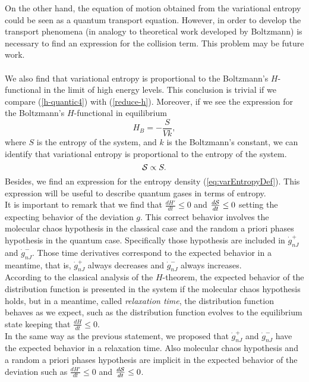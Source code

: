 On the other hand, the equation of motion obtained from the variational entropy could be seen as a quantum transport equation. However, in order to develop the transport phenomena (in analogy to theoretical work developed by Boltzmann) is necessary to find an expression for the collision term. This problem may be future work.\\
\\
We also find that variational entropy is proportional to the Boltzmann's $H$-functional in the limit of high energy levels. This conclusion is trivial if we compare (\ref{h-quantic4}) with (\ref{reduce-h}). Moreover, if we see the expression for the Boltzmann's $H$-functional in equilibrium
\begin{equation}
    H_{B}=-\frac{S}{Vk},
\end{equation}
where $S$ is the entropy of the system, and $k$ is the Boltzmann's constant, we can identify that variational entropy is proportional to the entropy of the system.\\
\begin{equation}
    \mathcal{S}\propto S.
\end{equation}
Besides, we find an expression for the entropy density (\ref{eq:varEntropyDef}). This expression will be useful to describe quantum gases in terms of entropy.\\
It is important to remark that we find that $\frac{dH'}{dt}\leq 0$ and $\frac{d\mathcal{S}}{dt}\leq 0$ setting the expecting behavior of the deviation $g$. This correct behavior involves the molecular chaos hypothesis in the classical case and the random a priori phases hypothesis in the quantum case. Specifically those hypothesis are included in $\dot{g}_{nJ}^{+}$ and $\dot{g}_{nJ}^{-}$. Those time derivatives correspond to the expected behavior in a meantime, that is, $\dot{g}_{nJ}^{+}$ always decreases and $\dot{g}_{nJ}^{-}$ always increases.\\ 
According to the classical analysis of the $H$-theorem, the expected behavior of the distribution function is presented in the system if the molecular chaos hypothesis holds, but in a meantime, called \textit{relaxation time}, the distribution function behaves as we expect, such as the distribution function evolves to the equilibrium state keeping that $\frac{dH}{dt}\leq 0$.\\
In the same way as the previous statement, we proposed that $\dot{g}_{nJ}^{+}$ and $\dot{g}_{nJ}^{-}$ have the expected behavior in a relaxation time. Also molecular chaos hypothesis and a random a priori phases hypothesis are implicit in the expected behavior of the deviation such as $\frac{dH'}{dt}\leq 0$ and $\frac{d\mathcal{S}}{dt}\leq 0$.



